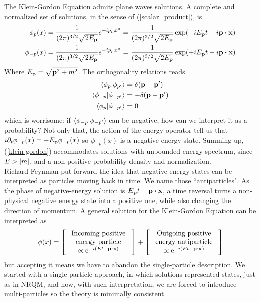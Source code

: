 The Klein-Gordon Equation admits plane waves solutions. A complete and normalized set of solutions, in the sense of  (\ref{scalar_product}), is
\begin{equation}
    \begin{aligned}
    \phi_{p}(x)&=\frac{1}{(2\pi)^{3/2}\sqrt{2E_{\vb{p}}}}e^{+ip_\mu x^\mu}=\frac{1}{(2\pi)^{3/2}\sqrt{2E_{\vb{p}}}}\exp(-iE_{\vb{p}}t+i\vb{p}\vdot\vb{x})\\
    \phi_{-p}(x)&=\frac{1}{(2\pi)^{3/2}\sqrt{2E_{\vb{p}}}}e^{-ip_\mu x^\mu}=\frac{1}{(2\pi)^{3/2}\sqrt{2E_{\vb{p}}}}\exp(+iE_{\vb{p}}t-i\vb{p}\vdot\vb{x})
    \end{aligned}
\end{equation}
Where $E_{\vb{p}}=\sqrt{\vb{p}^2+m^2}$. The orthogonality relations reads
\begin{equation}
    \begin{aligned}
    \braket{\phi_p}{\phi_{p^\prime}}&=\delta(\vb{p}-\vb{p}^\prime)\\\braket{\phi_{-p}}{\phi_{-p^\prime}}&=-\delta(\vb{p}-\vb{p}^\prime)\\
    \braket{\phi_{p}}{\phi_{-p^\prime}}&=0
    \end{aligned}
\end{equation}
which is worrisome: if $\braket{\phi_{-p}}{\phi_{-p^\prime}}$ can be negative, how can we interpret it as a probability? Not only that, the action of the energy operator tell us that $i\partial_t\phi_{- p}(x)=-E_{\vb{p}}\phi_{- p}(x)$ so $\phi_{-p}(x)$ is a negative energy state. Summing up, (\ref{klein-gordon}) accommodates solutions with unbounded energy spectrum, since $E>\abs{m}$, and a non-positive probability density and normalization.\\

Richard Feynman put forward the idea that negative energy states can be interpreted as particles moving back in time\cite{lancaster2014quantum}. We name those ``antiparticles". As the phase of negative-energy solution is $E_{\vb{p}}t-\vb{p}\vdot\vb{x}$, a time reversal turns a non-physical negative energy state into a positive one, while also changing the direction of momentum. A general solution for the Klein-Gordon Equation can be interpreted as 
\begin{equation}
\phi(x)=\left[\begin{array}{c}
\text { Incoming positive } \\
\text { energy particle } \\
\propto \mathrm{e}^{-i(E t-\vb{p} \vdot \vb{x})}
\end{array}\right]+\left[\begin{array}{c}
\text { Outgoing positive } \\
\text { energy antiparticle } \\
\propto \mathrm{e}^{+i(E t-\vb{p} \vdot \vb{x})}
\end{array}\right]
\end{equation}
but accepting it means we have to abandon the single-particle description. We started with a single-particle approach, in which solutions represented states, just as in NRQM, and now, with such interpretation, we are forced to introduce multi-particles so the theory is minimally consistent. \\

